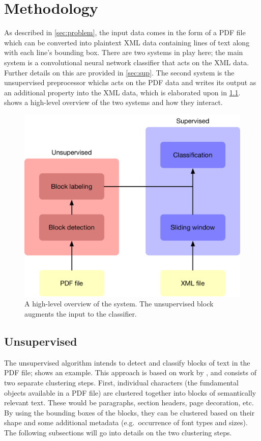 \section{Methodology}%
\label{sec:method}

As described in \cref{sec:problem}, the input data comes in the form of a
PDF file which can be converted into plaintext XML data containing lines of text
along with each line's bounding box. There are two systems in play here; the
main system is a convolutional neural network classifier that acts on the XML
data. Further details on this are provided in \cref{sec:sup}. The second
system is the unsupervised preprocessor whichs acts on the PDF data and writes
its output as an additional property into the XML data, which is elaborated upon
in \cref{sec:unsup}.  shows a high-level
overview of the two systems and how they interact.

\begin{figure}[tb]
  \centering
  \includegraphics[width=\textwidth]{figures/layout.pdf}
  \caption{A high-level overview of the system. The unsupervised block augments
  the input to the classifier.\label{fig:overview}}
\end{figure}

\subsection{Unsupervised}%
\label{sec:unsup}
The unsupervised algorithm intends to detect and classify blocks of text in the
PDF file;  shows an example. This approach is based on
work by \textcite{klampfl2014unsupervised}, and consists of two separate
clustering steps. First, individual characters (the fundamental objects
available in a PDF file) are clustered together into blocks of semantically
relevant text. These would be paragraphs, section headers, page decoration, etc.
By using the bounding boxes of the blocks, they can be clustered based on their
shape and some additional metadata (e.g.\ occurrence of font types and sizes).
The following subsections will go into details on the two clustering steps.

